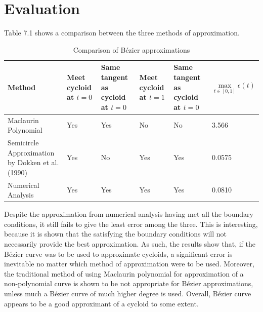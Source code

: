 \documentclass[11pt, oneside, appendixprefix=Appendix]{article}
\theoremstyle{definition}
\numberwithin{figure}{section}
\begin{document}
\section{Evaluation}

Table 7.1 shows a comparison between the three methods of approximation.

\begin{table}[H]
\begin{center}
    \begin{tabular}{m{2.6cm} | m{2cm} | m{2.1cm} | m{2cm} | m{2.1cm} | m{1.7cm}}
    \toprule
    Method & Meet cycloid at $t=0$ & Same tangent as cycloid at $t=0$ & Meet cycloid at $t=1$ & Same tangent as cycloid at $t=0$ & $\max\limits_{t \in [0, 1]} \epsilon (t)$ \\
    \toprule
    Maclaurin Polynomial & Yes & Yes & No & No & 3.566 \\
    \midrule
    Semicircle Approximation by Dokken et al. (1990) & Yes & No & Yes & Yes & 0.0575 \\
    \midrule
    Numerical Analysis & Yes & Yes & Yes & Yes & 0.0810 \\
    \bottomrule
    \end{tabular}
\end{center}
\caption{Comparison of B\'ezier approximations}
\end{table}

Despite the approximation from numerical analysis having met all the boundary conditions, it still fails to give the least error among the three. This is interesting, because it is shown that the satisfying the boundary conditions will not necessarily provide the best approximation. As such, the results show that, if the B\'ezier curve was to be used to approximate cycloids, a significant error is inevitable no matter which method of approximation were to be used. Moreover, the traditional method of using Maclaurin polynomial for approximation of a non-polynomial curve is shown to be not appropriate for B\'ezier approximations, unless much a B\'ezier curve of much higher degree is used. Overall, B\'ezier curve appears to be a good approximant of a cycloid to some extent.

\newpage




\newpage
\end{document}
